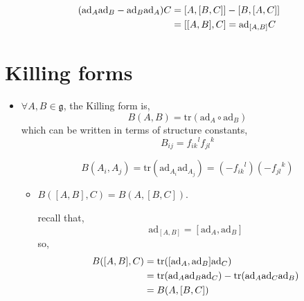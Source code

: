 \begin{itemize}
	\begin{tcolorbox}[title=proof:]
		\begin{align}
			(\mathrm{ad}_A \mathrm{ad}_B - \mathrm{ad}_B \mathrm{ad}_A) C &= [A, [B, C]] - [B, [A, C]] \notag \\
			&= [[A, B], C] = \mathrm{ad}_{[A, B]} C
		\end{align}
	\end{tcolorbox}
\end{itemize}

\section{Killing forms}
\begin{itemize}
	\item $\forall A, B \in \mathfrak{g}$, the Killing form is,
	\begin{equation}
		B(A, B) = \mathrm{tr}(\mathrm{ad}_A \circ \mathrm{ad}_B)
	\end{equation}
	which can be written in terms of structure constants,
	\begin{equation}
		B_{i j} = {f_{i k}}^l {f_{j l}}^k
	\end{equation}
	
	\begin{tcolorbox}[title=proof:]
		\begin{equation}
			B(A_i, A_j) = \mathrm{tr}(\mathrm{ad}_{A_i} \mathrm{ad}_{A_j}) = (- {f_{i k}}^l) (- {f_{j l}}^k)
		\end{equation}
	\end{tcolorbox}
	
	\begin{itemize}
		\item $B([A, B], C) = B(A, [B, C])$.
		
		\begin{tcolorbox}[title=proof:]
			recall that,
			\begin{equation}
				\mathrm{ad}_{[A, B]} = [\mathrm{ad}_A, \mathrm{ad}_B]
			\end{equation}
			so,
			\begin{align}
				B([A, B], C) &= \mathrm{tr}([\mathrm{ad}_A, \mathrm{ad}_B] \mathrm{ad}_C) \notag \\
				&= \mathrm{tr}(\mathrm{ad}_A \mathrm{ad}_B \mathrm{ad}_C) - \mathrm{tr}(\mathrm{ad}_A \mathrm{ad}_C \mathrm{ad}_B) \notag \\
				&= B(A, [B, C])
			\end{align}
		\end{tcolorbox}
	\end{itemize}
	

\end{itemize}
